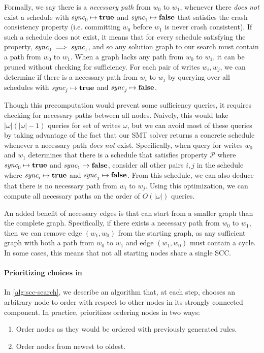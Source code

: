 Formally, we say there is a \textit{necessary path} from $w_0$ to $w_1$, whenever
there \textit{does not} exist a schedule with $\textit{sync}_0\mapsto\textbf{true}$
and $\textit{sync}_1\mapsto\textbf{false}$ that satisfies the crash consistency property
(i.e. committing $w_0$ before $w_1$ is never crash consistent).
If such a schedule does not exist, it means that for every schedule satisfying
the property, $\textit{sync}_0\implies\textit{sync}_1$, and so any solution graph to our
search must contain a path from $w_0$ to $w_1$.
When a graph lacks any path from $w_0$ to $w_1$, it can be pruned
without checking for sufficiency.
For each pair of writes $w_i,w_j$,
we can determine if there is a necessary path from $w_i$ to $w_j$
by querying over all schedules with
$\textit{sync}_j\mapsto\textbf{true}$ and $\textit{sync}_j\mapsto\textbf{false}$.

Though this precomputation would prevent some sufficiency queries,
it requires checking for necessary paths between all nodes.
Naively, this would take $|\omega|(|\omega|-1)$ queries for set of writes
$\omega$, but we can avoid most of these queries by taking advantage of the fact
that our SMT solver returns a concrete schedule whenever a necessary
path \textit{does not} exist.
Specifically, when query for writes $w_0$ and $w_1$ determines that there is
a schedule that satisfies property $\mathcal{P}$ where $\textit{sync}_0\mapsto\textbf{true}$
and $\textit{sync}_1\mapsto\textbf{false}$, consider all other pairs $i,j$ in the schedule
where $\textit{sync}_i\mapsto\textbf{true}$ and $\textit{sync}_j\mapsto\textbf{false}$.
From this schedule, we can also deduce that there is no necessary path
from $w_i$ to $w_j$. Using this optimization, we can compute all necessary paths
on the order of $O(|\omega|)$ queries.

An added benefit of necessary edges is that \sccsearch can start from 
a smaller graph than the complete graph. Specifically, if there exists
a necessary path from $w_0$ to $w_1$, then we can remove edge $(w_1, w_0)$
from the starting graph, as any sufficient graph with both a path from
$w_0$ to $w_1$ and edge $(w_1, w_0)$ must contain a cycle.
In some cases, this means that not all starting nodes share a single SCC.

\paragraph{Prioritizing choices in \sccsearch}
In \autoref{alg:scc-search}, we describe an algorithm that, at each step,
chooses an arbitrary node to order with respect to other nodes in its
strongly connected component.
In practice, \depsynth prioritizes ordering nodes in two ways:
\begin{enumerate}
  \item Order nodes as they would be ordered with previously generated rules.
  \item Order nodes from newest to oldest.
\end{enumerate}

